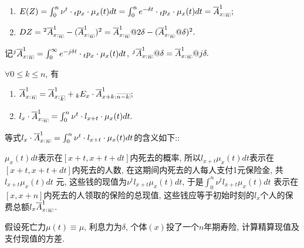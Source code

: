 \documentclass[lang=cn,10pt]{elegantbook}
\makeatletter
\DeclareRobustCommand{\annu}[1]{_{%
    \def\arraystretch{0}%
    \setlength\arraycolsep{1pt}%
    \setlength\arrayrulewidth{.2pt}%
    \begin{array}[b]{@{}c|}\hline
        \\[\arraycolsep]%
        \scriptstyle #1%
    \end{array}%
}}
\makeatother
\begin{document}
\begin{proposition}[精算现值与方差]
	\begin{enumerate}
		\item $E(Z)=\int_0^{n}{\nu^{t}\cdot {}_tp_x\cdot \mu_{x}(t)dt}=\int_0^{n}{e^{-\delta t}\cdot {}_tp_x\cdot \mu_{x}(t)dt}=\overline{A}_{x:}^1{}_{{}\annu{n}};$
		\item $DZ={}^2\overline{A}_{x:\annu{n}}^1-(\overline{A}_{x:\annu{n}}^1)^2=\overline{A}_{x:\annu{n}}^1@2\delta-(\overline{A}_{x:\annu{n}}^1@\delta)^2.$
	\end{enumerate}
\end{proposition}

\begin{remark}
	记$^j\overline{A}_{x:}^1{}_{\annu{n}}=\int_0^{\infty}{e^{-j\delta t}\cdot {}_tp_x\cdot \mu_{x}(t)dt}$, $^j\overline{A}_{x:}^1{}_{\annu{n}}@\delta=\overline{A}_{x:}^1{}_{\annu{n}}@j\delta.$
\end{remark}

\begin{corollary}[精算现值的性质]
	$\forall 0\leqslant k\leqslant n$, 有
	\begin{enumerate}
		\item $\overline{A}_{x:}^1{}_{{}\annu{n}}=\overline{A}_{x:}^1{}_{\annu k}+{}_kE_x\cdot\overline{A}_{x+k:}^1{}\annu{n-k};$
		\item $l_x\cdot\overline{A}_{x:\annu{n}}^1=\int_0^{n}{\nu^{t}\cdot l_{x+t}\cdot \mu_{x}(t)dt}.$
	\end{enumerate}
\end{corollary}

\begin{remark}
	等式$l_x\cdot\overline{A}_{x:}^1{}_{\annu{n}}=\int_0^{n}{\nu^{t}\cdot l_{x+t}\cdot \mu_{x}(t)dt}$的含义如下::

    $\mu_x(t)dt$表示在$[x+t,x+t+dt]$内死去的概率, 所以$l_{x+t}\mu_x(t)dt$表示在$[x+t,x+t+dt]$内死去的人数, 在这期间内死去的人每人支付1元保险金, 共$l_{x+t}\mu_x(t)dt$ 元, 这些钱的现值为$\nu^t l_{x+t}\mu_x(t)dt$, 于是$\int_0^n{\nu^t l_{x+t}\mu_x(t)dt}$ 表示在$[x,x+n]$内死去的人领取的保险的总现值, 这些钱应等于初始时刻的$l_x$个人的保费总额$l_x\overline{A}_{x:}^1{}_{\annu{n}}$.
\end{remark}

\begin{example}
    假设死亡力$\mu(t) \equiv \mu $, 利息力为$\delta$, 个体$(x)$投了一个$n$年期寿险, 计算精算现值及支付现值的方差.
\end{example}
\end{document}
